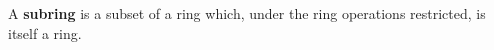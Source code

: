 A \textbf{subring} is a subset of a ring which, under the ring operations restricted, is itself a ring.
